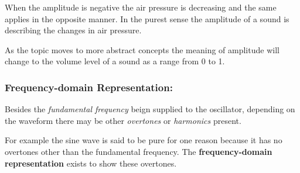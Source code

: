 \documentclass{article}
\begin{document}
When the amplitude is negative the air pressure is decreasing
and the same applies in the opposite manner. In the purest sense
the amplitude of a sound is describing the changes in air pressure.

\begin{cnote}
    As the topic moves to more abstract concepts the meaning of 
    amplitude will change to the volume level of a sound as a 
    range from 0 to 1.
\end{cnote}

\subsubsection{Frequency-domain Representation:}
Besides the \textit{fundamental frequency} beign supplied to the oscillator,
depending on the waveform there may be other \textit{overtones} or 
\textit{harmonics} present. 

For example the sine wave is said to be pure for one reason because
it has no overtones other than the fundamental frequency.
The \textbf{frequency-domain representation} exists to show these
overtones.

\newpage
\end{document}
